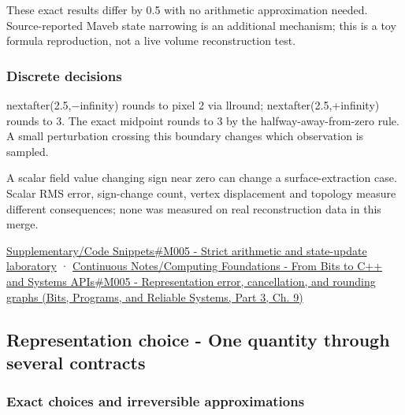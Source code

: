 These exact results differ by 0.5 with no arithmetic approximation needed. Source-reported Maveb state narrowing is an additional mechanism; this is a toy formula reproduction, not a live volume reconstruction test.

\subsubsection{Discrete decisions}\label{appendix-92ff77d4dfdc-discrete-decisions}

\hypertarget{appendix-92ff77d4dfdc-discrete-decisions}{}

nextafter(2.5,−infinity) rounds to pixel 2 via llround; nextafter(2.5,+infinity) rounds to 3. The exact midpoint rounds to 3 by the halfway-away-from-zero rule. A small perturbation crossing this boundary changes which observation is sampled.

A scalar field value changing sign near zero can change a surface-extraction case. Scalar RMS error, sign-change count, vertex displacement and topology measure different consequences; none was measured on real reconstruction data in this merge.

\hyperref[appendix-4e2236f53445-m005---strict-arithmetic-and-state-update-laboratory]{Supplementary/Code Snippets\#M005 - Strict arithmetic and state-update laboratory} · \href{../01-Bits-Programs-and-Reliable-Systems-P03/main.pdf\#nameddest=01-foundations-i-ch011-m005---representation-error-cancellation-and-rounding-graphs}{Continuous Notes/Computing Foundations - From Bits to C++ and Systems APIs\#M005 - Representation error, cancellation, and rounding graphs (Bits, Programs, and Reliable Systems, Part 3, Ch. 9)}

\subsection{Representation choice - One quantity through several contracts}\label{appendix-92ff77d4dfdc-representation-choice---one-quantity-through-several-contracts}

\hypertarget{appendix-92ff77d4dfdc-representation-choice---one-quantity-through-several-contracts}{}

\subsubsection{Exact choices and irreversible approximations}\label{appendix-92ff77d4dfdc-exact-choices-and-irreversible-approximations}


